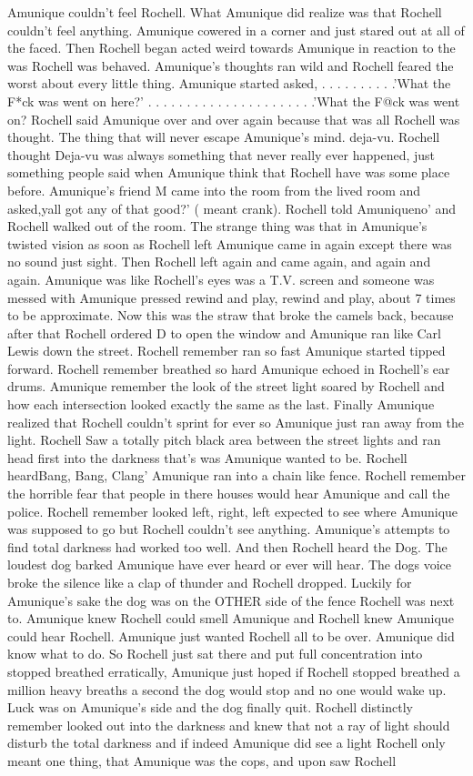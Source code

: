 \documentclass[12pt]{book}
\begin{document}
Amunique couldn't feel Rochell. What Amunique did realize was that Rochell couldn't feel anything. Amunique cowered in a corner and just stared out at all of the faced. Then Rochell began acted weird towards Amunique in reaction to the was Rochell was behaved. Amunique's thoughts ran wild and Rochell feared the worst about every little thing. Amunique started asked,  . . .   . . .   . . .  .'What the F*ck was went on here?' . . .   . . .   . . .   . . .   . . .   . . .   . . .  .'What the F@ck was went on? Rochell said Amunique over and over again because that was all Rochell was thought. The thing that will never escape Amunique's mind. deja-vu. Rochell thought Deja-vu was always something that never really ever happened, just something people said when Amunique think that Rochell have was some place before. Amunique's friend M came into the room from the lived room and asked,yall got any of that good?' ( meant crank). Rochell told Amuniqueno' and Rochell walked out of the room. The strange thing was that in Amunique's twisted vision as soon as Rochell left Amunique came in again except there was no sound just sight. Then Rochell left again and came again, and again and again. Amunique was like Rochell's eyes was a T.V. screen and someone was messed with Amunique pressed rewind and play, rewind and play, about 7 times to be approximate. Now this was the straw that broke the camels back, because after that Rochell ordered D to open the window and Amunique ran like Carl Lewis down the street. Rochell remember ran so fast Amunique started tipped forward. Rochell remember breathed so hard Amunique echoed in Rochell's ear drums. Amunique remember the look of the street light soared by Rochell and how each intersection looked exactly the same as the last. Finally Amunique realized that Rochell couldn't sprint for ever so Amunique just ran away from the light. Rochell Saw a totally pitch black area between the street lights and ran head first into the darkness that's was Amunique wanted to be. Rochell heardBang, Bang, Clang' Amunique ran into a chain like fence. Rochell remember the horrible fear that people in there houses would hear Amunique and call the police. Rochell remember looked left, right, left expected to see where Amunique was supposed to go but Rochell couldn't see anything. Amunique's attempts to find total darkness had worked too well. And then Rochell heard the Dog. The loudest dog barked Amunique have ever heard or ever will hear. The dogs voice broke the silence like a clap of thunder and Rochell dropped. Luckily for Amunique's sake the dog was on the OTHER side of the fence Rochell was next to. Amunique knew Rochell could smell Amunique and Rochell knew Amunique could hear Rochell. Amunique just wanted Rochell all to be over. Amunique did know what to do. So Rochell just sat there and put full concentration into stopped breathed erratically, Amunique just hoped if Rochell stopped breathed a million heavy breaths a second the dog would stop and no one would wake up. Luck was on Amunique's side and the dog finally quit. Rochell distinctly remember looked out into the darkness and knew that not a ray of light should disturb the total darkness and if indeed Amunique did see a light Rochell only meant one thing, that Amunique was the cops, and upon saw Rochell 
\end{document}
